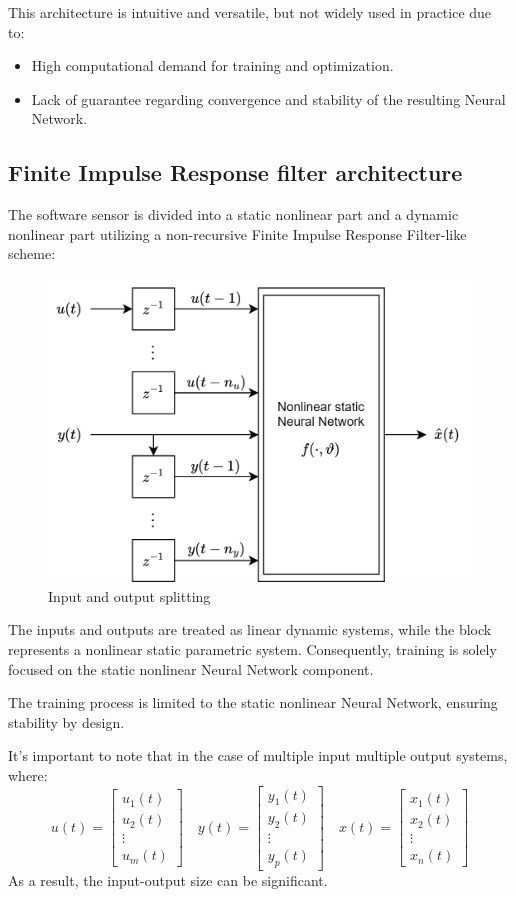 \noindent This architecture is intuitive and versatile, but not widely used in practice due to:
\begin{itemize}
    \item High computational demand for training and optimization.
    \item Lack of guarantee regarding convergence and stability of the resulting Neural Network.
\end{itemize}

\subsection{Finite Impulse Response filter architecture}
The software sensor is divided into a static nonlinear part and a dynamic nonlinear part utilizing a non-recursive Finite Impulse Response Filter-like scheme:
\begin{figure}[H]
    \centering
    \includegraphics[width=0.5\linewidth]{images/split.png}
    \caption{Input and output splitting}
\end{figure}

\noindent The inputs and outputs are treated as linear dynamic systems, while the block represents a nonlinear static parametric system. 
Consequently, training is solely focused on the static nonlinear Neural Network component.

The training process is limited to the static nonlinear Neural Network, ensuring stability by design.

It's important to note that in the case of multiple input multiple output systems, where:
\[u(t)=\begin{bmatrix} u_1(t) \\ u_2(t) \\ \vdots \\ u_m(t) \end{bmatrix} \quad y(t)=\begin{bmatrix} y_1(t) \\ y_2(t) \\ \vdots \\ y_p(t) \end{bmatrix} \quad x(t)=\begin{bmatrix} x_1(t) \\ x_2(t) \\ \vdots \\ x_n(t) \end{bmatrix}\]
As a result, the input-output size can be significant.

